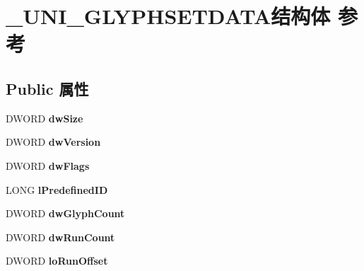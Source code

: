 \hypertarget{struct___u_n_i___g_l_y_p_h_s_e_t_d_a_t_a}{}\section{\+\_\+\+U\+N\+I\+\_\+\+G\+L\+Y\+P\+H\+S\+E\+T\+D\+A\+T\+A结构体 参考}
\label{struct___u_n_i___g_l_y_p_h_s_e_t_d_a_t_a}
\subsection*{Public 属性}
\begin{DoxyCompactItemize}
\item 
\mbox{\label{struct___u_n_i___g_l_y_p_h_s_e_t_d_a_t_a_ac3b03cf3d41ffe93134f446c75660465}} 
D\+W\+O\+RD {\bfseries dw\+Size}
\item 
\mbox{\label{struct___u_n_i___g_l_y_p_h_s_e_t_d_a_t_a_a6495dc4d97d1b507e827fd72c72967f1}} 
D\+W\+O\+RD {\bfseries dw\+Version}
\item 
\mbox{\label{struct___u_n_i___g_l_y_p_h_s_e_t_d_a_t_a_a1049d0efa2ce0ce6a43aaf573ea0adfc}} 
D\+W\+O\+RD {\bfseries dw\+Flags}
\item 
\mbox{\label{struct___u_n_i___g_l_y_p_h_s_e_t_d_a_t_a_a0fce684947164ea7dd4425aad72e434a}} 
L\+O\+NG {\bfseries l\+Predefined\+ID}
\item 
\mbox{\label{struct___u_n_i___g_l_y_p_h_s_e_t_d_a_t_a_a29ee30b69b0fba180944cb6028204e62}} 
D\+W\+O\+RD {\bfseries dw\+Glyph\+Count}
\item 
\mbox{\label{struct___u_n_i___g_l_y_p_h_s_e_t_d_a_t_a_a102f57ad7453274d23286bc24176d07a}} 
D\+W\+O\+RD {\bfseries dw\+Run\+Count}
\item 
\mbox{\label{struct___u_n_i___g_l_y_p_h_s_e_t_d_a_t_a_a6082dd94fcf9ed91c505eb3d15e0c98e}} 
D\+W\+O\+RD {\bfseries lo\+Run\+Offset}
\item 

\end{DoxyCompactItemize}
